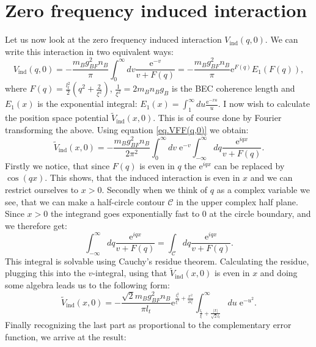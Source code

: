 \section{Zero frequency induced interaction}
Let us now look at the zero frequency induced interaction $V_{\text{ind}}(q,0)$. We can write this interaction in two equivalent ways:
\begin{equation}
V_{\text{ind}}(q,0) = -\frac{m_Bg_{BF}^2n_B}{\pi}\int_{0}^\infty dv \frac{\text{e}^{-v}}{v+F(q)} = -\frac{m_Bg_{BF}^2n_B}{\pi} \text{e}^{F(q)} E_1(F(q)),
\label{eq.VFF(q,0)}
\end{equation}
where $F(q) = \frac{l_t^2}{2}\left(q^2+\frac{2}{\xi^2} \right)$, $\frac{1}{\xi^2} = 2m_Bn_Bg_B$ is the BEC coherence length and $E_1(x)$ is the exponential integral: $E_1(x) = \int_1^\infty du \frac{\text{e}^{-xu}}{u}$. I now wish to calculate the position space potential $\tilde{V}_{\text{ind}}(x,0)$. This is of course done by Fourier transforming the above. Using equation \eqref{eq.VFF(q,0)} we obtain:
\begin{equation}
\tilde{V}_{\text{ind}}(x,0) = -\frac{m_Bg_{BF}^2n_B}{2\pi^2}\int_0^\infty dv\;  \text{e}^{-v}\int_{-\infty}^\infty dq \frac{\text{e}^{iqx}}{v+F(q)}.
\end{equation}
Firstly we notice, that since $F(q)$ is even in $q$ the $\text{e}^{iqx}$ can be replaced by $\cos(qx)$. This shows, that the induced interaction is even in $x$ and we can restrict ourselves to $x > 0$. Secondly when we think of $q$ as a complex variable we see, that we can make a half-circle contour $\mathcal{C}$ in the upper complex half plane. Since $x>0$ the integrand goes exponentially fast to 0 at the circle boundary, and we therefore get:
\begin{equation}
\int_{-\infty}^\infty dq \frac{\text{e}^{iqx}}{v+F(q)} = \int_\mathcal{C} dq  \frac{\text{e}^{iqx}}{v+F(q)}. \nonumber
\end{equation}
This integral is solvable using Cauchy's residue theorem. Calculating the residue, plugging this into the $v$-integral, using that $\tilde{V}_{\text{ind}}(x,0)$ is even in $x$ and doing some algebra leads us to the following form:
\begin{equation}
\tilde{V}_{\text{ind}}(x,0) = -\frac{\sqrt{2}m_Bg_{BF}^2n_B}{\pi l_t}\text{e}^{\frac{l_t^2}{\xi^2}+\frac{x^2}{2l_t^2}}\int_{\frac{l_t}{\xi}+\frac{|x|}{\sqrt{2}l_t}}^\infty du \; \text{e}^{-u^2}. \nonumber
\end{equation}
Finally recognizing the last part as proportional to the complementary error function, we arrive at the result:
